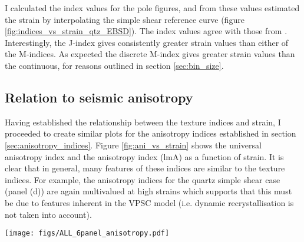\documentclass[a4paper,12pt,twoside]{report}
\numberwithin{equation}{chapter}
\begin{document}
I calculated the index values for the pole figures, and from these values estimated the strain by interpolating the simple shear reference curve (figure \ref{fig:indices_vs_strain_qtz_EBSD}). The index values agree with those from \cite{ParsonsThesis}. Interestingly, the J-index gives consistently greater strain values than either of the M-indices. As expected the discrete M-index gives greater strain values than the continuous, for reasons outlined in section \ref{sec:bin_size}.  

\subsection{Relation to seismic anisotropy}

Having established the relationship between the texture indices and strain, I proceeded to create similar plots for the anisotropy indices established in section \ref{sec:anisotropy_indices}. Figure \ref{fig:ani_vs_strain} shows the universal anisotropy index \citep[uA,][]{Ranganathan2008} and the \cite{Ledbetter2006} anisotropy index (lmA) as a function of strain. It is clear that in general, many features of these indices are similar to the texture indices. For example, the anisotropy indices for the quartz simple shear case (panel (d)) are again multivalued at high strains which supports that this must be due to features inherent in the VPSC model (i.e. dynamic recrystallisation is not taken into account).    

\begin{figure*}[p]
  \centering
    \texttt{[image: figs/ALL\_6panel\_anisotropy.pdf]}
  \caption[Anisotropy measures and strain]{Seismic anisotropy measures, the Universal Elastic Anisotropy Index (uA) and the ***** against strain. \textbf{Top row} shows data from olivine VPSC models, \textbf{middle row} shows quartz, and \textbf{bottom row} shows post-perovskite. \textbf{Right column} shows data from axial compression models and \textbf{left column} shows data from simple shear models. All calculations use $n$ = 10,000 grains. } 
  \label{fig:ani_vs_strain}
\end{figure*} 


 
\end{document}
